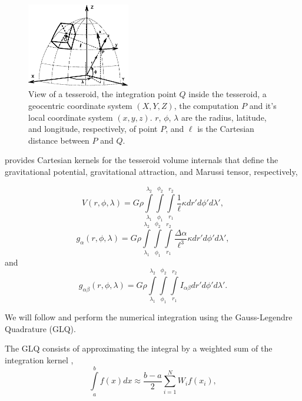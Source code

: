 \documentclass[manuscript]{geophysics}
\begin{document}
\begin{figure}
    \centering
    \includegraphics[width=0.4\textwidth]{figs/tesseroid}
    \caption{
        View of a tesseroid,
        the integration point $Q$ inside the tesseroid,
        a geocentric coordinate system $(X, Y, Z)$,
        the computation $P$ and it's local coordinate system $(x, y, z)$.
        $r$, $\phi$, $\lambda$ are
        the radius, latitude, and longitude, respectively, of point $P$,
        and $\ell$ is the Cartesian distance between $P$ and $Q$.
    }
    \label{fig:tesseroid}
\end{figure}

\citet{Grombein2013} provides Cartesian kernels for the tesseroid volume
internals that define the gravitational potential, gravitational attraction,
and Marussi tensor, respectively,

\begin{equation}
    V(r,\phi,\lambda) = G \rho
        \int\limits_{\lambda_1}^{\lambda_2}
        \int\limits_{\phi_1}^{\phi_2}
        \int\limits_{r_1}^{r_2}
        \frac{1}{\ell} \kappa  dr' d\phi' d\lambda',
    \label{eq:tesspot}
\end{equation}
\begin{equation}
    g_{\alpha}(r,\phi,\lambda) = G \rho
        \int\limits_{\lambda_1}^{\lambda_2}
        \int\limits_{\phi_1}^{\phi_2}
        \int\limits_{r_1}^{r_2}
        \frac{\Delta\alpha}{\ell^3} \kappa dr' d\phi' d\lambda',
    \label{eq:tessgrav}
\end{equation}
\noindent
and
\begin{equation}
    g_{\alpha\beta}(r,\phi,\lambda) = G \rho
        \int\limits_{\lambda_1}^{\lambda_2}
        \int\limits_{\phi_1}^{\phi_2}
        \int\limits_{r_1}^{r_2}
        I_{\alpha\beta}
        dr' d\phi' d\lambda'.
    \label{eq:tesstensor}
\end{equation}

We will follow \citet{Asgharzadeh2007} and perform the numerical integration
using the Gauss-Legendre Quadrature (GLQ).

The GLQ consists of approximating the integral by a weighted sum of the
integration kernel \citep{Hildebrand1987},
\begin{equation}
    \int\limits_a^b f(x) dx \approx
    \frac{b-a}{2}\sum\limits_{i=1}^N W_i f(x_i),
    \label{eq:glq1d}
\end{equation}
\end{document}
